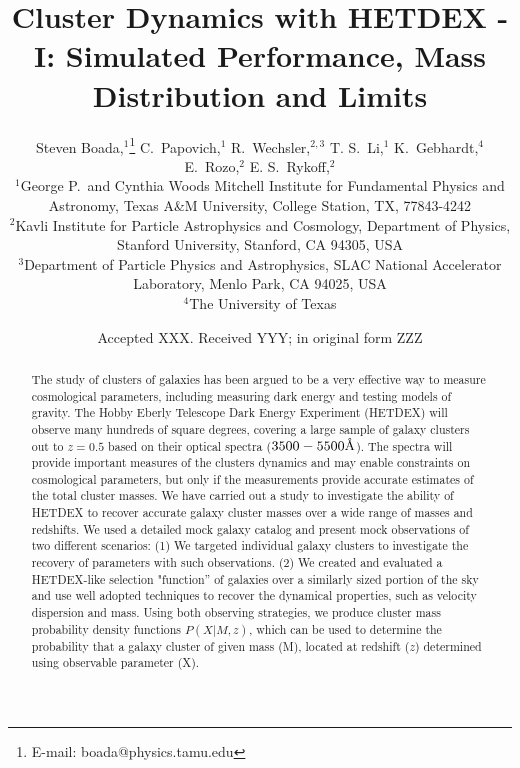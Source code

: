 \documentclass[fleqn,usenatbib]{mnras}
\title[Short Title]{Cluster Dynamics with HETDEX - I: Simulated Performance, Mass Distribution and Limits}
\author[S. Boada et al.]{
Steven Boada,$^{1}$\thanks{E-mail: boada@physics.tamu.edu}
C.~Papovich,$^{1}$
R.~Wechsler,$^{2,3}$
T. S.~Li,$^{1}$\newauthor\phantom{x}
K.~Gebhardt,$^{4}$
E.~Rozo,$^{2}$
E. S.~Rykoff,$^{2}$
\\
$^{1}$George P.\ and Cynthia Woods Mitchell Institute for
Fundamental Physics and Astronomy, Texas A\&M University, College Station, TX, 77843-4242\\
$^{2}$Kavli Institute for Particle Astrophysics and Cosmology, Department of Physics, Stanford University, Stanford, CA 94305, USA\\
$^{3}$Department of Particle Physics and Astrophysics, SLAC National Accelerator Laboratory, Menlo Park, CA 94025, USA\\
$^{4}$The University of Texas}
\date{Accepted XXX. Received YYY; in original form ZZZ}
\begin{document}
\label{firstpage}
\pagerange{\pageref{firstpage}--\pageref{lastpage}}
\maketitle

\begin{abstract}
\noindent
The study of clusters of galaxies has been argued to be a very effective way to measure cosmological parameters, including measuring dark energy and testing models of gravity. The Hobby Eberly Telescope Dark Energy Experiment (HETDEX) will observe many hundreds of square degrees, covering a large sample of galaxy clusters out to $z = 0.5$ based on their optical spectra ($3500-5500\hbox{\AA}$). The spectra will provide important measures of the clusters dynamics and may enable constraints on cosmological parameters, but only if the measurements provide accurate estimates of the total cluster masses. We have carried out a study to investigate the ability of HETDEX to recover accurate galaxy cluster masses over a wide range of masses and redshifts. We used a detailed mock galaxy catalog and present mock observations of two different scenarios: (1) We targeted individual galaxy clusters to investigate the recovery of parameters with such observations. (2) We created and evaluated a HETDEX-like selection "function'' of galaxies over a similarly sized portion of the sky and use well adopted techniques to recover the dynamical properties, such as velocity dispersion and mass. Using both observing strategies, we produce cluster mass probability density functions $P(X|M,z)$, which can be used to determine the probability that a galaxy cluster of given mass (M), located at redshift ($z$) determined using observable parameter (X). 
\end{abstract}
\end{document}
